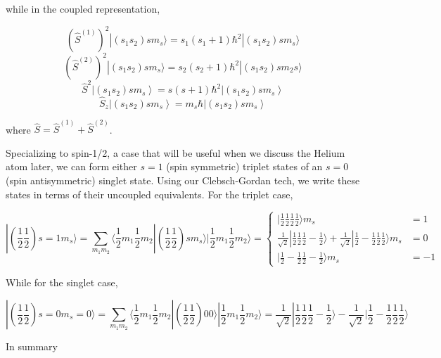 while in the coupled representation, 

\[
  (\hat{S}^{(1)})^2 |(s_1s_2) sm_s \rangle = s_1 (s_1 + 1)\hbar^2 |(s_1 s_2)
sm_s \rangle \]
\[ (\hat{S}^{(2)})^2 |(s_1s_2)sm_s \rangle = s_2 (s_2 + 1 ) \hbar^2
|(s_1s_2)sm_2 s \rangle \] 
\[
\hat{S}^2 \left| (s_1 s_2) s m_s \right\rangle = s(s + 1) \hbar^2 \left| (s_1
s_2) s m_s \right\rangle \] \[
\hat{S}_z \left| (s_1 s_2) s m_s \right\rangle = m_s \hbar \left| (s_1 s_2) s m_s \right\rangle
\] \vspace{3px}

where $\hat{S} = \hat{S}^{(1)} + \hat{S}^{(2)}$. 


Specializing to spin-1/2, a case that will be useful when we discuss the Helium
atom later, we can form either $s = 1$ (spin symmetric) triplet states of an $s
= 0$ (spin antisymmetric) singlet state. Using our Clebsch-Gordan tech, we
write these states in terms of their uncoupled equivalents. For the triplet
case, 

\[
  |\left( \frac{1}{2}\frac{1}{2} \right) s=1 m_s \rangle = \sum_{m_1m_2}
  \langle \frac{1}{2} m_1 \frac{1}{2} m_2 | \left( \frac{1}{2}\frac{1}{2}
  \right) sm_s \rangle | \frac{1}{2} m_1 \frac{1}{2} m_2 \rangle = \begin{cases}
    |\frac{1}{2}\frac{1}{2}\frac{1}{2}\frac{1}{2}\rangle m_s &= 1 \\
    \frac{1}{\sqrt{2}}|\frac{1}{2}\frac{1}{2}\frac{1}{2}-\frac{1}{2} \rangle
    + \frac{1}{\sqrt{2}} |\frac{1}{2}-\frac{1}{2}\frac{1}{2}\frac{1}{2} \rangle
    m_s &= 0 \\
    |\frac{1}{2} -\frac{1}{2}\frac{1}{2}-\frac{1}{2}\rangle m_s &= -1
  \end{cases}   
\] \vspace{3px}

While for the singlet case, 

\[
|\left( \frac{1}{2}\frac{1}{2} \right) s = 0 m_s = 0\rangle = \sum_{m_1m_2}^{}
\langle \frac{1}{2}m_1 \frac{1}{2}m_2 | \left( \frac{1}{2}\frac{1}{2} \right)
00\rangle | \frac{1}{2} m_1 \frac{1}{2}m_2 \rangle = \frac{1}{\sqrt{2}}
| \frac{1}{2}\frac{1}{2}\frac{1}{2}-\frac{1}{2} \rangle - \frac{1}{\sqrt{2}}
| \frac{1}{2} -\frac{1}{2} \frac{1}{2}\frac{1}{2} \rangle
\] \vspace{3px}

In summary 

